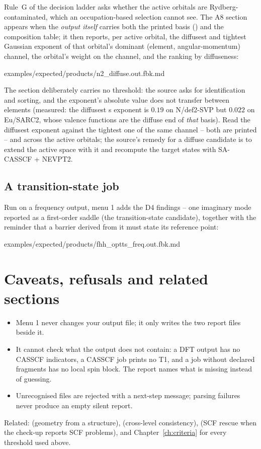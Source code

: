 Rule~G of the decision ladder asks whether the active orbitals are
Rydberg-contaminated, which an occupation-based selection cannot see.  The A8
section appears when the \emph{output itself} carries both the printed basis
() and the composition table; it then reports, per active
orbital, the diffusest and tightest Gaussian exponent of that orbital's
dominant (element, angular-momentum) channel, the orbital's weight on the
channel, and the ranking by diffuseness:


  {examples/expected/products/n2_diffuse.out.fbk.md}

The section deliberately carries no threshold: the source asks for
identification and sorting, and the exponent's absolute value does not transfer
between elements (measured: the diffusest s exponent is $0.19$ on N/def2-SVP
but $0.022$ on Eu/SARC2, whose valence functions are the diffuse end of \emph{that}
basis).  Read the diffusest exponent against the tightest one of the same
channel -- both are printed -- and across the active orbitals; the source's
remedy for a diffuse candidate is to extend the active space with it and
recompute the target states with SA-CASSCF + NEVPT2.

\subsection{A transition-state job}

Run on a frequency output, menu 1 adds the D4 findings -- one imaginary mode
reported as a first-order saddle (the transition-state candidate), together
with the reminder that a barrier derived from it must state its reference
point:


  {examples/expected/products/fhh_optts_freq.out.fbk.md}

\section{Caveats, refusals and related sections}

\begin{refusalbox}
\begin{itemize}
  \item Menu 1 never changes your output file; it only writes the two report
    files beside it.
  \item It cannot check what the output does not contain: a DFT output has no
    CASSCF indicators, a CASSCF job prints no T1, and a job without declared
    fragments has no local spin block. The report names what is missing instead
    of guessing.
  \item Unrecognised files are rejected with a next-step message; parsing
    failures never produce an empty silent report.
\end{itemize}
\end{refusalbox}

Related:  (geometry from a structure),  (cross-level
consistency),  (SCF rescue when the check-up reports SCF problems), and
Chapter~\ref{ch:criteria} for every threshold used above.

